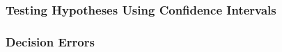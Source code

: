 \documentclass[handout]{beamer}
\newcommand{\blue}[1]{\textcolor{blue2}{#1}}
\begin{document}
\begin{frame}
\frametitle{Testing Hypotheses Using Confidence Intervals}

%
%
%
%
%
%

\end{frame}


\begin{frame}
\frametitle{Decision Errors}

%
%
%
%

\end{frame}
\end{document}
